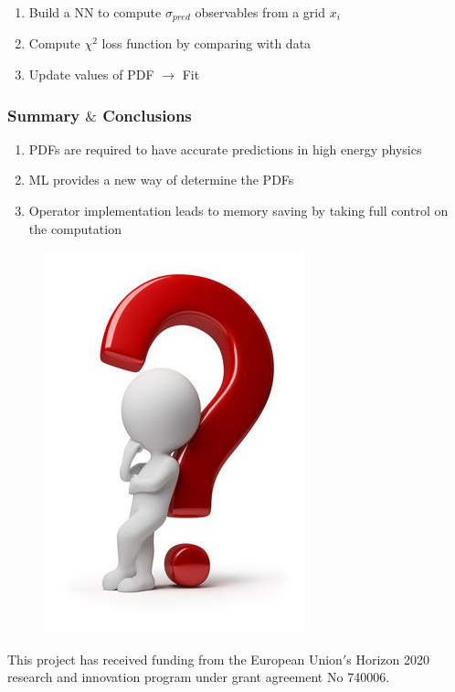 \documentclass[aspectratio=43]{beamer}
\begin{document}
\begin{frame}
	
	\begin{enumerate}
		\item Build a NN to compute $\sigma_{pred}$ observables from a grid $x_{i}$
		\item Compute $\chi^{2}$ loss function by comparing with data
		\item Update values of PDF $\longrightarrow$ {\color{violet} Fit}
	\end{enumerate}

\end{frame}

\begin{frame}
	
	\frametitle{Summary $\&$ Conclusions}

	\begin{enumerate}
		\item PDFs are required to have accurate predictions in high energy physics
		\item ML provides a new way of determine the PDFs
		\item Operator implementation leads to memory saving by taking full control on the computation
	\end{enumerate}

\end{frame}

\begin{frame}

	
	\begin{figure}
		\includegraphics[width = 3 cm]{plots/thinking2.png}
	\end{figure}
	
	{\small \color{blue} This project has received funding from the European Union$'$s Horizon 2020 research and innovation program under grant agreement No 740006.}

\end{frame}
\end{document}
